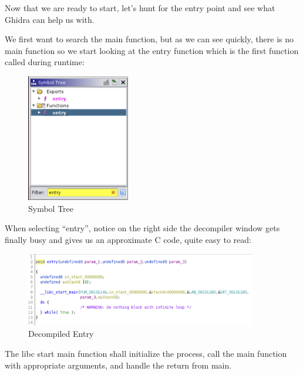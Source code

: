 \documentclass{article}
\begin{document}
\noindent\linebreak
Now that we are ready to start, let’s hunt for the entry point and see what Ghidra can help us with.

\noindent\linebreak
We first want to search the main function, but as we can see quickly, there is no main function so we start 
looking at the entry function which is the first function called during runtime:
\begin{figure}[H]
\centering
\includegraphics[width=0.4\textwidth]{img/ghidra_2.jpg}
\caption{Symbol Tree}
\label{fig:ghidra_2}
\end{figure}

\noindent\linebreak
When selecting “entry”, notice on the right side the decompiler window gets finally busy and gives us an 
approximate C code, quite easy to read:
\begin{figure}[H]
\centering
\includegraphics[width=0.9\textwidth]{img/ghidra_3.jpg}
\caption{Decompiled Entry}
\label{fig:ghidra_3}
\end{figure}

\noindent\linebreak
The libc start main function shall initialize the process, call the main function with appropriate 
arguments, and handle the return from main.
\end{document}
